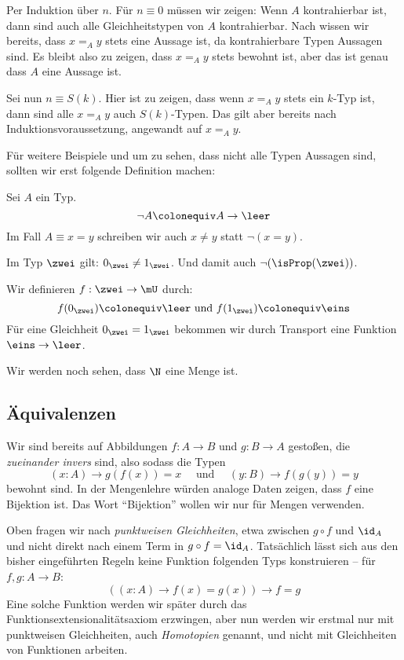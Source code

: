 \begin{beweis}
  Per Induktion über $n$.
  Für $n\equiv 0$ müssen wir zeigen: Wenn $A$ kontrahierbar ist, dann sind auch alle Gleichheitstypen von $A$ kontrahierbar.
  Nach  wissen wir bereits, dass $x=_Ay$ stets eine Aussage ist,
  da kontrahierbare Typen Aussagen sind.
  Es bleibt also zu zeigen, dass $x=_Ay$ stets bewohnt ist, aber das ist genau dass $A$ eine Aussage ist.

  Sei nun $n\equiv S(k)$. Hier ist zu zeigen, dass wenn $x=_Ay$ stets ein $k$-Typ ist,
  dann sind alle $x=_Ay$ auch $S(k)$-Typen. Das gilt aber bereits nach Induktionsvoraussetzung, angewandt auf $x=_Ay$.
\end{beweis}

Für weitere Beispiele und um zu sehen, dass nicht alle Typen Aussagen sind, sollten wir erst folgende Definition machen:

\begin{definition}
  Sei $A$ ein Typ.
  \[
    \neg A\colonequiv A\to\leer
    \]
    Im Fall $A\equiv x=y$ schreiben wir auch $x\neq y$ statt $\neg(x=y)$.
\end{definition}

\begin{bemerkung}
  Im Typ $\zwei$ gilt: $0_\zwei\neq 1_\zwei$. Und damit auch $\neg(\isProp(\zwei))$.
\end{bemerkung}
\begin{beweis}
  Wir definieren $f:\zwei\to\mU$ durch:
  \[
    f(0_\zwei)\colonequiv \leer\text{ und }f(1_\zwei)\colonequiv \eins
    \]
    Für eine Gleichheit $0_\zwei=1_\zwei$ bekommen wir durch Transport eine Funktion $\eins\to\leer$.
\end{beweis}

Wir werden noch sehen, dass $\N$ eine Menge ist.

\subsection{Äquivalenzen}

Wir sind bereits auf Abbildungen $f:A\to B$ und $g:B\to A$ gestoßen, die \emph{zueinander invers} sind, also sodass die Typen
\[
  (x:A)\to g(f(x))=x\quad \text{ und }\quad (y:B)\to f(g(y))=y 
\]
bewohnt sind.
In der Mengenlehre würden analoge Daten zeigen, dass $f$ eine Bijektion ist.
Das Wort ``Bijektion'' wollen wir nur für Mengen verwenden.

Oben fragen wir nach \emph{punktweisen Gleichheiten}, etwa zwischen $g\circ f$ und $\id_A$ und
nicht direkt nach einem Term in $g\circ f = \id_A$.
Tatsächlich lässt sich aus den bisher eingeführten Regeln keine Funktion folgenden Typs konstruieren -- für $f,g:A\to B$:
\[
  ((x:A)\to f(x)=g(x))\to f=g
\]
Eine solche Funktion werden wir später durch das Funktionsextensionalitätsaxiom erzwingen,
aber nun werden wir erstmal nur mit punktweisen Gleichheiten, auch \emph{Homotopien} genannt, und nicht mit Gleichheiten von Funktionen arbeiten.

